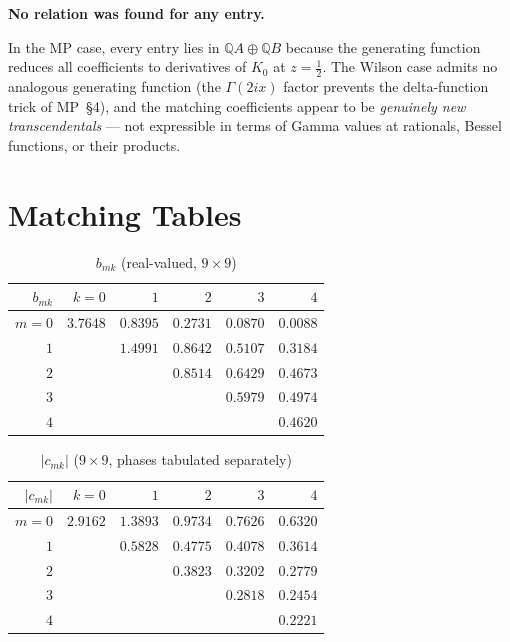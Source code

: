 \documentclass[11pt,a4paper]{article}
\newcommand{\Q}{\mathbb{Q}}
\begin{document}
\textbf{No relation was found for any entry.}

In the MP case, every entry lies in $\Q A \oplus \Q B$ because the
generating function reduces all coefficients to
derivatives of $K_0$ at $z = \tfrac12$.  The Wilson case admits no
analogous generating function (the $\Gamma(2ix)$ factor prevents the
delta-function trick of MP~\S4), and the matching coefficients appear to
be \emph{genuinely new transcendentals} --- not expressible in
terms of Gamma values at rationals, Bessel functions, or their
products.

\section{Matching Tables}

\begin{table}[ht]
\centering\small
\caption{$b_{mk}$ (real-valued, $9 \times 9$)}
\begin{tabular}{r|rrrrr}
\toprule
$b_{mk}$ & $k=0$ & $1$ & $2$ & $3$ & $4$ \\
\midrule
$m=0$ & $3.7648$ & $0.8395$ & $0.2731$ & $0.0870$ & $0.0088$ \\
$1$   & & $1.4991$ & $0.8642$ & $0.5107$ & $0.3184$ \\
$2$   & & & $0.8514$ & $0.6429$ & $0.4673$ \\
$3$   & & & & $0.5979$ & $0.4974$ \\
$4$   & & & & & $0.4620$ \\
\bottomrule
\end{tabular}
\end{table}

\begin{table}[ht]
\centering\small
\caption{$|c_{mk}|$ ($9 \times 9$, phases tabulated separately)}
\begin{tabular}{r|rrrrr}
\toprule
$|c_{mk}|$ & $k=0$ & $1$ & $2$ & $3$ & $4$ \\
\midrule
$m=0$ & $2.9162$ & $1.3893$ & $0.9734$ & $0.7626$ & $0.6320$ \\
$1$   & & $0.5828$ & $0.4775$ & $0.4078$ & $0.3614$ \\
$2$   & & & $0.3823$ & $0.3202$ & $0.2779$ \\
$3$   & & & & $0.2818$ & $0.2454$ \\
$4$   & & & & & $0.2221$ \\
\bottomrule
\end{tabular}
\end{table}
\end{document}
